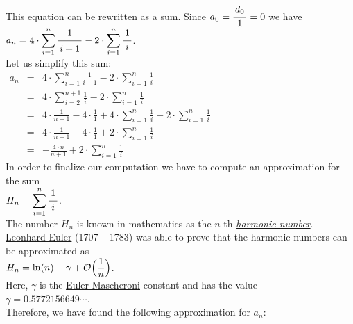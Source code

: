 \\[0.2cm] 
This equation can be rewritten as a sum.  Since $a_0 = \bruch{d_0}{1} = 0$
we have
\\[0.2cm]
\hspace*{1.3cm}
$\displaystyle a_{n} = 4 \cdot \sum\limits_{i=1}^n \bruch{1}{i+1} - 2 \cdot \sum\limits_{i=1}^n \bruch{1}{i}$.  
\\[0.2cm]
Let us simplify this sum:
\\[0.2cm]
\hspace*{1.3cm}
$
\begin{array}{lcl}
 a_{n} & = & \displaystyle 4 \cdot \sum_{i=1}^n \frac{1}{i+1} - 2 \cdot \sum_{i=1}^n \frac{1}{i} \\[0.5cm]
       & = & \displaystyle 4 \cdot \sum_{i=2}^{n+1} \frac{1}{i} - 2 \cdot \sum_{i=1}^n \frac{1}{i} \\[0.5cm]
       & = & \displaystyle 4 \cdot \frac{1}{n+1} - 4 \cdot \frac{1}{1} + 4 \cdot \sum_{i=1}^{n} \frac{1}{i} - 2 \cdot \sum_{i=1}^n \frac{1}{i} \\[0.5cm]
       & = & \displaystyle 4 \cdot \frac{1}{n+1} - 4 \cdot \frac{1}{1} + 2 \cdot \sum_{i=1}^{n} \frac{1}{i}  \\[0.5cm]
       & = & \displaystyle - \frac{4 \cdot n}{n+1}  + 2 \cdot \sum_{i=1}^{n} \frac{1}{i}  
\end{array}
$
\\[0.2cm]
In order to finalize our computation we have to compute an approximation for the sum
\\[0.2cm]
\hspace*{1.3cm}
$H_n = \displaystyle\sum\limits_{i=1}^{n}\bruch{1}{i}$.
\\[0.2cm] 
The number $H_n$ is known in mathematics as the $n$-th 
\href{http://en.wikipedia.org/wiki/Harmonic_number}{\emph{harmonic number}}.
\href{http://en.wikipedia.org/wiki/Leonhard_Euler}{Leonhard Euler} (1707 -- 1783) was able to prove
that the harmonic numbers can be approximated as
\\[0.2cm]
\hspace*{1.3cm}
$\displaystyle H_n = \ln(n) + \gamma + \mathcal{O}\Bigl(\frac{1}{n}\Bigr)$. 
\\[0.2cm]  
Here, $\gamma$ is the
\href{http://en.wikipedia.org/wiki/Euler-Mascheroni_constant}{Euler-Mascheroni} constant and has the
value
\\[0.2cm]
\hspace*{1.3cm}
$\gamma = 0.5772156649 \cdots$.
\\[0.2cm]
Therefore, we have found the following approximation for $a_n$:
